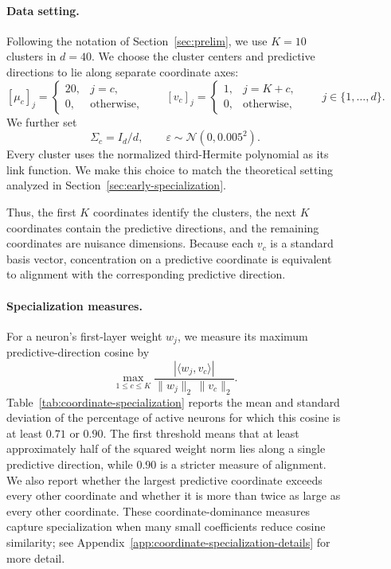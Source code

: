 \documentclass{article}
\newcounter{setting}[section]
\begin{document}
\begin{figure}
\paragraph{Data setting.}
Following the notation of Section~\ref{sec:prelim}, we use \(K=10\) clusters
in \(d=40\). We choose the cluster centers and predictive directions to lie
along separate coordinate axes:
\[
[\mu_c]_j =
\begin{cases}
20, & j=c,\\
0, & \text{otherwise},
\end{cases}
\qquad
[v_c]_j =
\begin{cases}
1, & j=K+c,\\
0, & \text{otherwise},
\end{cases}
\qquad
j\in\{1,\ldots,d\}.
\]
We further set
\[
\Sigma_c = I_d/d,
\qquad
\varepsilon \sim \mathcal{N}(0,0.005^2).
\]
Every cluster uses the normalized third-Hermite polynomial as its link
function. We make this choice to match the theoretical setting analyzed in
Section~\ref{sec:early-specialization}.

Thus, the first \(K\) coordinates identify the clusters, the next \(K\)
coordinates contain the predictive directions, and the remaining coordinates
are nuisance dimensions. Because each \(v_c\) is a standard basis vector,
concentration on a predictive coordinate is equivalent to alignment with the
corresponding predictive direction.

\paragraph{Specialization measures.}
For a neuron's first-layer weight \(w_j\), we measure its maximum
predictive-direction cosine by
\[
    \max_{1\leq c\leq K}
    \frac{|\langle w_j,v_c\rangle|}
    {\|w_j\|_2\,\|v_c\|_2}.
\]
Table~\ref{tab:coordinate-specialization} reports the mean and standard
deviation of the percentage of active neurons for which this cosine is at
least \(0.71\) or \(0.90\). The first threshold means that at
least approximately half of the squared weight norm lies along a single predictive
direction, while \(0.90\) is a stricter measure of alignment. We also report
whether the largest predictive coordinate exceeds every other coordinate and
whether it is more than twice as large as every other coordinate. These
coordinate-dominance measures capture specialization when many small
coefficients reduce cosine similarity; see
Appendix~\ref{app:coordinate-specialization-details} for more detail.



\end{figure}
\end{document}
